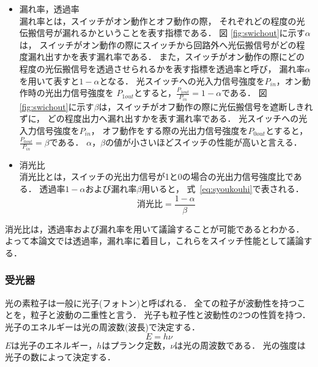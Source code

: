 \begin{itemize}
\item 漏れ率，透過率\\
漏れ率とは，スイッチがオン動作とオフ動作の際，
それぞれどの程度の光伝搬信号が漏れるかということを表す指標である．
図 \ref{fig:swichout}に示す$\alpha $は，
スイッチがオン動作の際にスイッチから回路外へ光伝搬信号がどの程度漏れ出すかを表す漏れ率である．
また，スイッチがオン動作の際にどの程度の光伝搬信号を透過させられるかを表す指標を透過率と呼び，
漏れ率$\alpha$を用いて表すと$1- \alpha$となる．
光スイッチへの光入力信号強度を$P_{in}$，オン動作時の光出力信号強度を
$P_{1out}$とすると，$\frac{P_{1out}}{P_{in}}=1- \alpha$である．
図 \ref{fig:swichout}に示す$\beta $は，スイッチがオフ動作の際に光伝搬信号を遮断しきれずに，
どの程度出力へ漏れ出すかを表す漏れ率である．
光スイッチへの光入力信号強度を$P_{in}$，
オフ動作をする際の光出力信号強度を$P_{0out}$とすると，
$\frac{P_{0out}}{P_{in}}=\beta$である．
$\alpha $，$ \beta $の値が小さいほどスイッチの性能が高いと言える．
\item 消光比\\
消光比とは，スイッチの光出力信号が1と0の場合の光出力信号強度比である．
透過率$1- \alpha$および漏れ率$\beta $用いると，
式~\eqref{eq:syoukouhi}で表される．
\begin{equation}
消光比= \frac{1- \alpha}{\beta}
\label{eq:syoukouhi}
\end{equation}
\end{itemize}

消光比は，透過率および漏れ率を用いて議論することが可能であるとわかる．
よって本論文では透過率，漏れ率に着目し，これらをスイッチ性能として議論する．

\subsubsection{受光器}
光の素粒子は一般に光子(フォトン)と呼ばれる．
全ての粒子が波動性を持つことを，粒子と波動の二重性と言う．
光子も粒子性と波動性の2つの性質を持つ\cite{大津}．
光子のエネルギーは光の周波数(波長)で決定する．
\begin{equation}
E = h \nu \label{eq:hikarienergy}
\end{equation}
$Eは光子のエネルギー，hはプランク定数，\nu$は光の周波数である．
光の強度は光子の数によって決定する．

